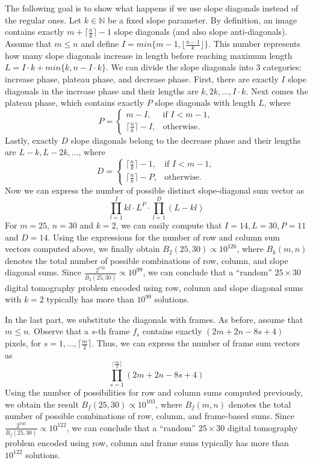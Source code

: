 \documentclass{report}
\begin{document}
The following goal is to show what happens if we use slope diagonals instead of the regular ones. Let $k \in \mathbb{N}$ be a fixed slope parameter. By definition, an image contains exactly \(m+\lceil \frac{n}{k} \rceil -1\) slope diagonals (and also slope anti-diagonals). Assume that \(m \le n\) and define \(I= min\{m-1, \lfloor \frac{n-1}{k} \rfloor \}\). This number represents how many slope diagonals increase in length before reaching maximum length \(L = I \cdot k + min\{k, n - I \cdot k\}\). We can divide the slope diagonals into 3 categories: increase phase, plateau phase, and decrease phase. First, there are exactly $I$ slope diagonals in the increase phase and their lengths are \(k, 2k, \dots, I \cdot k\). Next comes the plateau phase, which contains exactly \(P\) slope diagonals with length \(L\), where \[
P =
\begin{cases}
m - I, & \text{if } I < m-1, \\
\lceil \frac{n}{k} \rceil - I, & \text{otherwise}.
\end{cases}
\]
\newpage
Lastly, exactly \(D\) slope diagonals belong to the decrease phase and their lengths are \(L - k, L - 2k, \dots\), where \[
D =
\begin{cases}
\lceil \frac{n}{k} \rceil - 1, & \text{if } I < m-1, \\
\lceil \frac{n}{k} \rceil - P, & \text{otherwise}.
\end{cases}
\]
Now we can express the number of possible distinct slope-diagonal sum vector as \[
\prod_{l=1}^I{kl} \cdot L^P \cdot \prod_{l=1}^D{(L-kl)}
\]
For \(m = 25\), \(n = 30\) and \(k=2\), we can easily compute that \(I = 14, L = 30, P = 11\) and \(D = 14\). Using the expressions for the number of row and column sum vectors computed above, we finally obtain \(B_2(25,30) \propto 10^{126}\), where \(B_k(m,n)\) denotes the total number of possible combinations of row, column, and slope diagonal sums. Since \(\frac{2^{750}}{B_2(25,30)} \propto 10^{99}\), we can conclude that a ``random'' \(25 \times 30\) digital tomography problem encoded using row, column and slope diagonal sums with \(k=2\) typically has more than \(10^{99}\) solutions.

In the last part, we substitute the diagonals with frames. As before, assume that \(m \le n\). Observe that a \(s\)-th frame \(f_s\) contains exactly \((2m + 2n - 8s + 4)\) pixels, for \(s = 1, \dots, \lceil \frac{m}{2} \rceil\). Thus, we can express the number of frame sum vectors as \[
\prod_{s=1}^{\lceil \frac{m}{2} \rceil}{(2m + 2n -8s+4)}
\]
Using the number of possibilities for row and column sums computed previously, we obtain the result \(B_f(25,30) \propto 10^{103}\), where \(B_f(m,n)\) denotes the total number of possible combinations of row, column, and frame-based sums. Since \(\frac{2^{750}}{B_f(25,30)} \propto 10^{122}\), we can conclude that a ``random'' \(25 \times 30\) digital tomography problem encoded using row, column and frame sums typically has more than \(10^{122}\) solutions.
\end{document}
